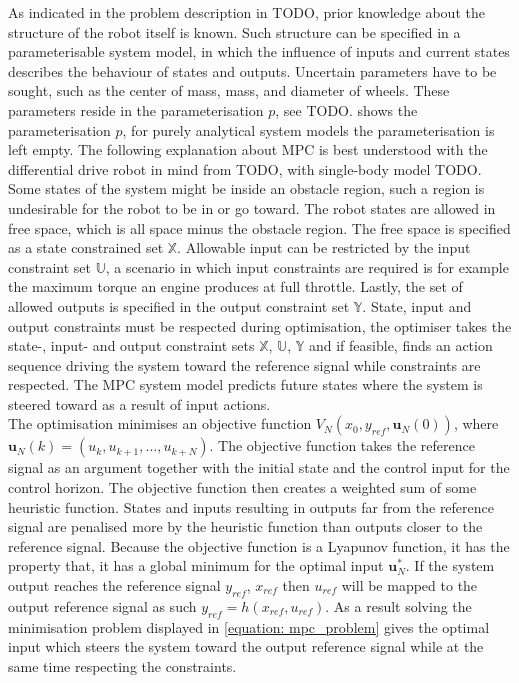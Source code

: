 As indicated in the problem description in TODO, prior knowledge about the structure of the robot itself is known. Such structure can be specified in a parameterisable system model, in which the influence of inputs and current states describes the behaviour of states and outputs. Uncertain parameters have to be sought, such as the center of mass, mass, and diameter of wheels. These parameters reside in the parameterisation $p$, see TODO.  shows the parameterisation $p$, for purely analytical system models the parameterisation is left empty. The following explanation about \ac{MPC} is best understood with the differential drive robot in mind from TODO, with single-body model TODO. Some states of the system might be inside an obstacle region, such a region is undesirable for the robot to be in or go toward. The robot states are allowed in free space, which is all space minus the obstacle region. The free space is specified as a state constrained set $\mathbb{X}$. Allowable input can be restricted by the input constraint set $\mathbb{U}$, a scenario in which input constraints are required is for example the maximum torque an engine produces at full throttle. Lastly, the set of allowed outputs is specified in the output constraint set $\mathbb{Y}$. State, input and output constraints must be respected during optimisation, the optimiser takes the state-, input- and output constraint sets $\mathbb{X}$, $\mathbb{U}$, $\mathbb{Y}$ and if feasible, finds an action sequence driving the system toward the reference signal while constraints are respected. The \ac{MPC} system model predicts future states where the system is steered toward as a result of input actions.\\

The optimisation minimises an objective function $V_{N}(x_{0}, y_{ref}, \mathbf{u}_{N}(0))$, where\\ $ \mathbf{u}_{N}(k) = (u_k, u_{k+1}, \dots , u_{k+N})$. The objective function takes the reference signal as an argument together with the initial state and the control input for the control horizon. The objective function then creates a weighted sum of some heuristic function. States and inputs resulting in outputs far from the reference signal are penalised more by the heuristic function than outputs closer to the reference signal. Because the objective function is a Lyapunov function, it has the property that, it has a global minimum for the optimal input $\mathbf{u}_{N}^*$. If the system output reaches the reference signal $y_{ref}$, $x_{ref}$ then $u_{ref}$ will be mapped to the output reference signal as such $y_{ref} = h(x_{ref}, u_{ref})$. As a result solving the minimisation problem displayed in \cref{equation: mpc_problem} gives the optimal input which steers the system toward the output reference signal while at the same time respecting the constraints. 

